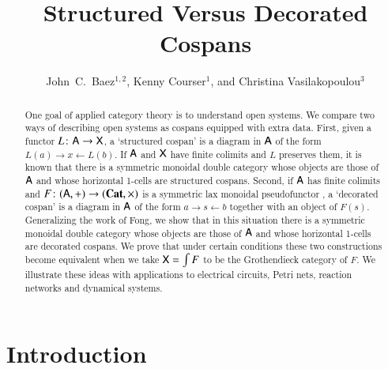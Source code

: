 \documentclass[reqno]{amsart}
\title{Structured Versus Decorated Cospans}
\author{John\ C.\ Baez$^{1,2}$, Kenny Courser$^1$, and Christina Vasilakopoulou$^3$}
\begin{document}
\begin{abstract}
One goal of applied category theory is to understand open systems.  We compare two ways of describing open systems as cospans equipped with extra data.    First, given a functor $L \colon \mathsf{A} \to \mathsf{X}$, a `structured cospan' is a diagram in $\mathsf{A}$ of the form $L(a) \rightarrow x \leftarrow L(b)$.  If $\mathsf{A}$ and $\mathsf{X}$ have finite colimits and $L$ preserves them, it is known that there is a symmetric monoidal double category whose objects are those of $\mathsf{A}$ and whose horizontal 1-cells are structured cospans.   Second, if $\mathsf{A}$ has finite colimits and $F \colon (\mathsf{A},+) \to (\mathbf{Cat},\times)$ is a symmetric lax monoidal pseudofunctor , a `decorated cospan' is a diagram in $\mathsf{A}$ of the form $a \rightarrow s \leftarrow b$ together with an object of $F(s)$.   Generalizing the work of Fong, we show that in this situation there is a symmetric monoidal double category whose objects are those of $\mathsf{A}$ and whose horizontal 1-cells are decorated cospans.   We prove that under certain conditions these two constructions become equivalent when we take $\mathsf{X} = \int F$ to be the Grothendieck category of $F$.  We illustrate these ideas with applications to electrical circuits, Petri nets, reaction networks and dynamical systems.
\end{abstract}

\maketitle

\setcounter{tocdepth}{1}
\tableofcontents

\section{Introduction}
\end{document}
